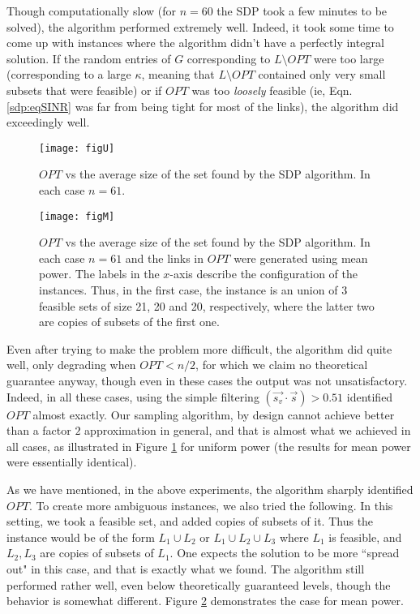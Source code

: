 \documentclass[11pt]{amsart}
\begin{document}
Though computationally slow (for $n = 60$ the SDP took a few minutes to be solved), the algorithm performed extremely well. Indeed, it took some time to come up with instances where the algorithm didn't have a perfectly integral solution. If the random entries of $G$ corresponding to $L \setminus OPT$ were too large (corresponding to a large $\kappa$, meaning that $L \setminus OPT$ contained only very small subsets that were feasible) or if $OPT$ was too \emph{loosely} feasible (ie, Eqn. \ref{sdp:eqSINR} was far from being tight for most of the links), the algorithm did exceedingly well.



\begin{figure}
\begin{center}
\texttt{[image: figU]}
\caption{$OPT$ vs the average size of the set found by the SDP algorithm. In each case $n = 61$.} \label{fig:uniform}
\end{center}
\end{figure}

\begin{figure}
\begin{center}
\texttt{[image: figM]}
\caption{$OPT$ vs the average size of the set found by the SDP algorithm. In each case $n = 61$ and the links in $OPT$ were generated using mean power. The labels in the $x$-axis describe the configuration of the instances. Thus, in the first case, the instance is an union of $3$ feasible sets of size 21, 20 and 20, respectively, where the latter two are copies of subsets of the first one.} \label{fig:mean}
\end{center}
\end{figure}


Even after trying to make the problem more difficult, the algorithm did quite well, only degrading when $OPT < n/2$, for which we claim no theoretical guarantee anyway, though even in these cases the output was not unsatisfactory. Indeed,
in all these cases, using the simple filtering $(\vec{s_v} \cdot \vec{s}) > 0.51$ identified $OPT$ almost exactly. Our sampling algorithm, by design cannot achieve better than a factor $2$ approximation in general, and that is almost what we achieved in all cases, as illustrated in Figure \ref{fig:uniform} for uniform power (the results for mean power were essentially identical).

As we have mentioned, in the above experiments, the algorithm sharply identified $OPT$. To create more
ambiguous instances, we also tried the following. In this setting, we took a feasible set, and added copies of subsets of
it. Thus the instance would be of the form $L_1 \cup L_2$ or $L_1 \cup L_2 \cup L_3$ where $L_1$ is feasible, and
$L_2, L_3$ are copies of subsets of $L_1$. One expects the solution to be more ``spread out" in this case, and that is exactly what we found.
The algorithm still performed rather well, even below theoretically guaranteed levels, though the behavior is somewhat different. Figure \ref{fig:mean} demonstrates the case for mean power.
\end{document}
